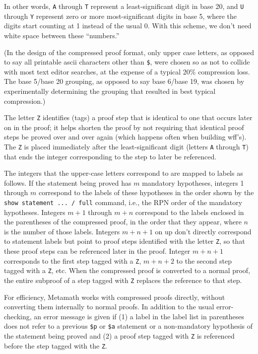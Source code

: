 In other words, \texttt{A} through \texttt{T} represent a
least-significant digit in base 20, and \texttt{U} through \texttt{Y}
represent zero or more most-significant digits in base 5, where the
digits start counting at 1 instead of the usual 0. With this scheme, we
don't need white space between these ``numbers.''

(In the design of the compressed proof format, only upper case letters,
as opposed to say all printable {\sc ascii} characters other than
\texttt{\$}, were chosen so as not to collide with most text editor
searches, at the expense of a typical 20\% compression
loss.  The base 5/base 20 grouping, as opposed to say base 6/base 19,
was chosen by experimentally determining the grouping that resulted in
best typical compression.)

The letter \texttt{Z} identifies (tags) a proof step that is identical to one
that occurs later on in the proof; it helps shorten the proof by not requiring
that identical proof steps be proved over and over again (which happens often
when building wff's).  The \texttt{Z} is placed immediately after the
least-significant digit (letters \texttt{A} through \texttt{T}) that ends the integer
corresponding to the step to later be referenced.

The integers that the upper-case letters correspond to are mapped to labels as
follows.  If the statement being proved has $m$ mandatory hypotheses, integers
1 through $m$ correspond to the labels of these hypotheses in the order shown
by the \texttt{show statement ... / full} command, i.e., the RPN order of the mandatory
hypotheses.  Integers $m+1$ through $m+n$ correspond to the labels enclosed in
the parentheses of the compressed proof, in the order that they appear, where
$n$ is the number of those labels.  Integers $m+n+1$ on up don't directly
correspond to statement labels but point to proof steps identified with the
letter \texttt{Z}, so that these proof steps can be referenced later in the
proof.  Integer $m+n+1$ corresponds to the first step tagged with a \texttt{Z},
$m+n+2$ to the second step tagged with a \texttt{Z}, etc.  When the compressed
proof is converted to a normal proof, the entire subproof of a step tagged
with \texttt{Z} replaces the reference to that step.

For efficiency, Metamath works with compressed proofs directly, without
converting them internally to normal proofs.  In addition to the usual
error-checking, an error message is given if (1) a label in the label list in
parentheses does not refer to a previous \texttt{\$p} or \texttt{\$a} statement or a
non-mandatory hypothesis of the statement being proved and (2) a proof step
tagged with \texttt{Z} is referenced before the step tagged with the \texttt{Z}.


